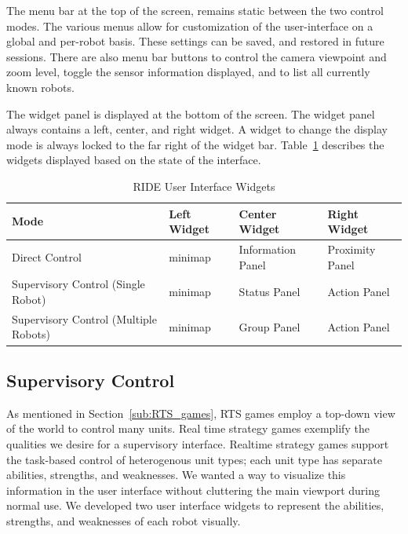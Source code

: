 The menu bar at the top of the screen, remains static between the two control modes. The various menus allow for customization of the user-interface on a global and per-robot basis. These settings can be saved, and restored in future sessions. There are also menu bar buttons to control the camera viewpoint and zoom level, toggle the sensor information displayed, and to list all currently known robots.

The widget panel is displayed at the bottom of the screen. The widget panel always contains a left, center, and right widget. A widget to change the display mode is always locked to the far right of the widget bar. Table~\ref{tab:ui-widgets} describes the widgets displayed based on the state of the interface.

\begin{table}[ht]
\label{tab:ui-widgets}
\begin{center}
    \begin{tabular}{ | p{4cm} | l | l | l |}
    \hline
    \textbf{Mode} & \textbf{Left Widget} & \textbf{Center Widget} & \textbf{Right Widget} \\ \hline
    Direct Control & minimap & Information Panel & Proximity Panel \\ \hline
    Supervisory Control (Single Robot) & minimap & Status Panel & Action Panel \\ \hline
    Supervisory Control (Multiple Robots) & minimap & Group Panel & Action Panel \\ \hline
    \hline
    \end{tabular}
    \caption{RIDE User Interface Widgets}
\end{center}
\end{table}

\subsection{Supervisory Control}
\label{subs:ui-supervisor}

As mentioned in Section~\ref{sub:RTS_games}, RTS games employ a top-down view of the world to control many units. Real time strategy games exemplify the qualities we desire for a supervisory interface. Realtime strategy games support the task-based control of heterogenous unit types; each unit type has separate abilities, strengths, and weaknesses. We wanted a way to visualize this information in the user interface without cluttering the main viewport during normal use. We developed two user interface widgets to represent the abilities, strengths, and weaknesses of each robot visually.

